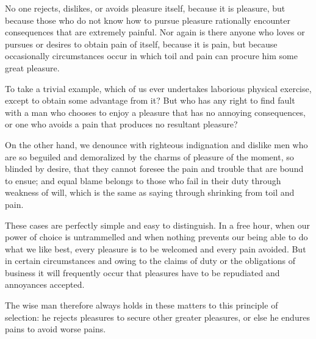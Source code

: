 No one rejects, dislikes, or avoids pleasure itself, because it is pleasure, but because those who do not know how to pursue pleasure rationally encounter consequences that are extremely painful. Nor again is there anyone who loves or pursues or desires to obtain pain of itself, because it is pain, but because occasionally circumstances occur in which toil and pain can procure him some great pleasure. 

To take a trivial example, which of us ever undertakes laborious physical exercise, except to obtain some advantage from it? But who has any right to find fault with a man who chooses to enjoy a pleasure that has no annoying consequences, or one who avoids a pain that produces no resultant pleasure?

On the other hand, we denounce with righteous indignation and dislike men who are so beguiled and demoralized by the charms of pleasure of the moment, so blinded by desire, that they cannot foresee the pain and trouble that are bound to ensue; and equal blame belongs to those who fail in their duty through weakness of will, which is the same as saying through shrinking from toil and pain.

These cases are perfectly simple and easy to distinguish. In a free hour, when our power of choice is untrammelled and when nothing prevents our being able to do what we like best, every pleasure is to be welcomed and every pain avoided. But in certain circumstances and owing to the claims of duty or the obligations of business it will frequently occur that pleasures have to be repudiated and annoyances accepted. 

The wise man therefore always holds in these matters to this principle of selection: he rejects pleasures to secure other greater pleasures, or else he endures pains to avoid worse pains.

\vfil\eject

